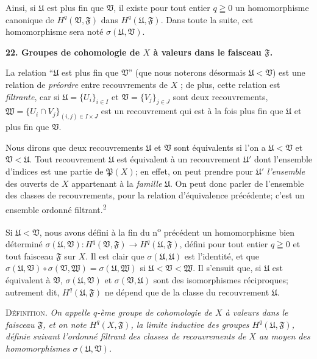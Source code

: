 Ainsi, si $\mathfrak{U}$ est plus fin que $\mathfrak{V}$, il existe pour tout entier $q \geqq 0$ un homomorphisme canonique de $H^q(\mathfrak{V}, \mathfrak{F})$ dans $H^q(\mathfrak{U}, \mathfrak{F})$. Dans toute la suite, cet homomorphisme sera noté $\sigma(\mathfrak{U}, \mathfrak{V})$.


\textbf{22. Groupes de cohomologie de $X$ à valeurs dans le faisceau $\mathfrak{F}$.}

La relation ``$\mathfrak{U}$ est plus fin que $\mathfrak{V}$'' (que nous noterons désormais $\mathfrak{U} < \mathfrak{V}$) est une relation de \textit{préordre} entre recouvrements de $X$ ; de plus, cette relation est \textit{filtrante}, car si $\mathfrak{U} = \{U_i\}_{i \in I}$ et $\mathfrak{V} = \{V_j\}_{j \in J}$ sont deux recouvrements, $\mathfrak{W} = \{U_i \cap V_j\}_{(i,j) \in I \times J}$ est un recouvrement qui est à la fois plus fin que $\mathfrak{U}$ et plus fin que $\mathfrak{V}$.

Nous dirons que deux recouvrements $\mathfrak{U}$ et $\mathfrak{V}$ sont équivalents si l'on a $\mathfrak{U} < \mathfrak{V}$ et $\mathfrak{V} < \mathfrak{U}$. Tout recouvrement $\mathfrak{U}$ est équivalent à un recouvrement $\mathfrak{U}'$ dont l'ensemble d'indices est une partie de $\mathfrak{P}(X)$; en effet, on peut prendre pour $\mathfrak{U}'$ \textit{l'ensemble} des ouverts de $X$ appartenant à la \textit{famille} $\mathfrak{U}$. On peut donc parler de l'ensemble des classes de recouvrements, pour la relation d'équivalence précédente; c'est un ensemble ordonné filtrant.\textsuperscript{2}

Si $\mathfrak{U} < \mathfrak{V}$, nous avons défini à la fin du n\textsuperscript{o} précédent un homomorphisme bien déterminé $\sigma(\mathfrak{U}, \mathfrak{V}) : H^q(\mathfrak{V}, \mathfrak{F}) \to H^q(\mathfrak{U}, \mathfrak{F})$, défini pour tout entier $q \geqq 0$ et tout faisceau $\mathfrak{F}$ sur $X$. Il est clair que $\sigma(\mathfrak{U}, \mathfrak{U})$ est l'identité, et que $\sigma(\mathfrak{U}, \mathfrak{V}) \circ \sigma(\mathfrak{V}, \mathfrak{W}) = \sigma(\mathfrak{U}, \mathfrak{W})$ si $\mathfrak{U} < \mathfrak{V} < \mathfrak{W}$. Il s'ensuit que, si $\mathfrak{U}$ est équivalent à $\mathfrak{V}$, $\sigma(\mathfrak{U}, \mathfrak{V})$ et $\sigma(\mathfrak{V}, \mathfrak{U})$ sont des isomorphismes réciproques; autrement dit, $H^q(\mathfrak{U}, \mathfrak{F})$ ne dépend que de la classe du recouvrement $\mathfrak{U}$.

\textsc{Définition}. \textit{On appelle $q$-ème groupe de cohomologie de $X$ à valeurs dans le faisceau $\mathfrak{F}$, et on note $H^q(X, \mathfrak{F})$, la limite inductive des groupes $H^q(\mathfrak{U}, \mathfrak{F})$, définie suivant l'ordonné filtrant des classes de recouvrements de $X$ au moyen des homomorphismes $\sigma(\mathfrak{U}, \mathfrak{V})$.}


